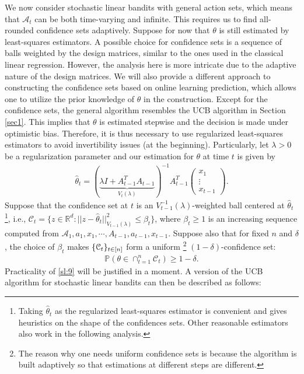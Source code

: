 \documentclass[10pt,a4article]{amsart}
\numberwithin{equation}{section}
\theoremstyle{plain}
\theoremstyle{definition}
\def\R{{\mathbb R}}
\def\R{{\mathbb R}}
\def\P{{\mathbb P}}
\def\t{{\theta}}
\begin{document}
We now consider stochastic linear bandits with general action sets, which means that $\mathcal A_t$ can be both time-varying and infinite.
This requires us to find all-rounded confidence sets adaptively.  
Suppose for now that $\t$ is still estimated by least-squares estimators. 
A possible choice for confidence sets is a sequence of balls weighted by the design matrices, similar to the ones used in the classical linear regression.
However, the analysis here is more intricate due to the adaptive nature of the design matrices. 
We will also provide a different approach to constructing the confidence sets based on online learning prediction, which allows one to utilize the prior knowledge of $\t$ in the construction. 
Except for the confidence sets, the general algorithm resembles the UCB algorithm in Section \ref{sec1}. 
This implies that $\t$ is estimated stepwise and the decision is made under optimistic bias.  
Therefore, it is thus necessary to use regularized least-squares estimators to avoid invertibility issues (at the beginning). Particularly, let $\lambda>0$ be a regularization parameter and our estimation for $\t$ at time $t$ is given by 
\begin{align*}
\hat{\t}_t = (\underbrace{\lambda I +A^T_{t-1}A_{t-1}}_{V_t(\lambda)})^{-1}A^T_{t-1}\begin{pmatrix}
x_1 \\
\vdots \\
x_{t-1}
\end{pmatrix}.
\end{align*}
Suppose that the confidence set at $t$ is an $V^{-1}_{t-1}(\lambda)$-weighted ball centered at $\hat{\t}_t$\footnote{Taking $\hat{\t}_t$ as the regularized least-squares estimator is convenient and gives heuristics on the shape of the confidences sets. Other reasonable estimators also work in the following analysis.}, i.e., $\mathcal C_t = \{z\in\R^d: ||z-\hat{\t}_t||^2_{V_{t-1}(\lambda)}\leq\beta_t\}$, where $\beta_t\geq 1$ is an increasing sequence computed from $\mathcal A_1, a_1, x_1, \cdots, A_{t-1}, a_{t-1}, x_{t-1}$. Suppose also that for fixed $n$ and $\delta$, the choice of $\beta_t$ makes $\mathcal \{\mathcal C_t\}_{t\in [n]}$ form a uniform \footnote{The reason why one needs uniform confidence sets is because the algorithm is built adaptively so that estimations at different steps are different.} $(1-\delta)$-confidence set:
\begin{align}
\P(\t\in\cap_{t=1}^n\mathcal C_t)\geq 1-\delta.\label{sl:9}
\end{align} 
Practicality of \eqref{sl:9} will be justified in a moment. A version of the UCB algorithm for stochastic linear bandits can then be described as follows:
\end{document}
